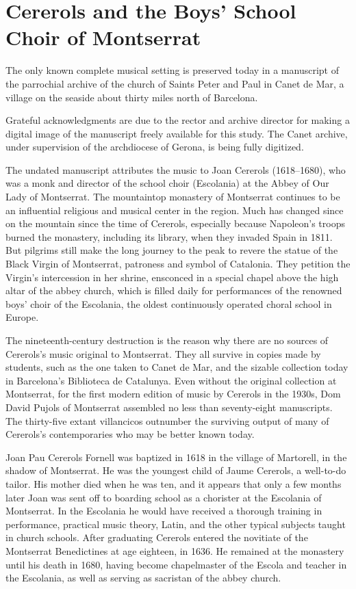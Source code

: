 \section{Cererols and the Boys' School Choir of Montserrat}

The only known complete musical setting is preserved today in a manuscript of
the parrochial archive of the church of Saints Peter and Paul in Canet de Mar, a
village on the seaside about thirty miles north of Barcelona.%
\begin{Footnote}
    Grateful acknowledgments are due to the rector and archive director for
    making a digital image of the manuscript freely available for this study.
    The Canet archive, under supervision of the archdiocese of Gerona, is being
    fully digitized.
\end{Footnote}
The undated manuscript attributes the music to Joan Cererols (1618--1680), who
was a monk and director of the school choir (Escolania) at the Abbey of Our Lady
of Montserrat.
The mountaintop monastery of Montserrat continues to be an influential
religious and musical center in the region. 
Much has changed since on the mountain since the time of Cererols, especially
because Napoleon's troops burned the monastery, including its library, when they
invaded Spain in 1811.
But pilgrims still make the long journey to the peak to revere the statue of the
Black Virgin of Montserrat, patroness and symbol of Catalonia.
They petition the Virgin's intercession in her shrine, ensconced in a special
chapel above the high altar of the abbey church, which is filled daily for
performances of the renowned boys' choir of the Escolania, the oldest
continuously operated choral school in Europe.

The nineteenth-century destruction is the reason why there are no sources of
Cererols's music original to Montserrat.
They all survive in copies made by students, such as the one taken to Canet de
Mar, and the sizable collection today in Barcelona's Biblioteca de Catalunya.
Even without the original collection at Montserrat, for the first modern edition
of music by Cererols in the 1930s, Dom David Pujols of Montserrat assembled no
less than seventy-eight manuscripts.
The thirty-five extant villancicos outnumber the surviving output of many of
Cererols's contemporaries who may be better known today.\XXX[who?]

Joan Pau Cererols Fornell was baptized in 1618 in the village of Martorell, in
the shadow of Montserrat.%
    \Autocite{Balanza:CererolsFamily}
He was the youngest child of Jaume Cererols, a well-to-do tailor.
His mother died when he was ten, and it appears that only a few months later
Joan was sent off to boarding school as a chorister at the Escolania of
Montserrat.%
    \Autocite{Balanza:CererolsFamily}
In the Escolania he would have received a thorough training in performance,
practical music theory, Latin, and the other typical subjects taught in church
schools.
After graduating Cererols entered the novitiate of the Montserrat Benedictines
at age eighteen, in 1636.
He remained at the monastery until his death in 1680, having become chapelmaster
of the Escola and teacher in the Escolania, as well as serving as sacristan of
the abbey church.

